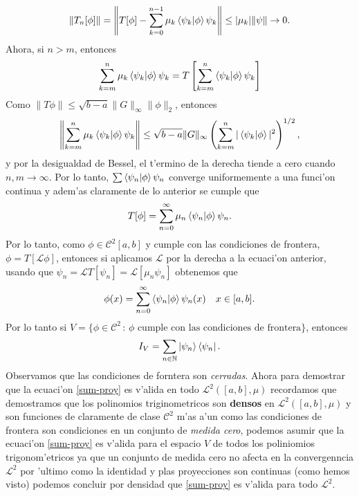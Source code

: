\documentclass[main.tex]{subfiles}
\begin{document}
\[
  \|T_{n}[\phi]\|=\left\|T[\phi]-\sum_{k=0}^{n-1}\mu_{k}\braket{\psi_{k}|\phi}\psi_{k}\right\|\leq|\mu_{k}|\|\psi\|\to0.
\]
Ahora, si $n>m$, entonces
\[
  \sum_{k=m}^{n}\mu_{k}\braket{\psi_{k}|\phi}\psi_{k}=T\left[\sum_{k=m}^{n}\braket{\psi_{k}|\phi}\psi_{k}\right]
\]
Como $\|T\phi\|\leq\sqrt{b-a}\|G\|_{\infty}\|\phi\|_{2}$, entonces
\[
  \left\|\sum_{k=m}^{n}\mu_{k}\braket{\psi_{k}|\phi}\psi_{k}\right\|\leq
  \sqrt{b-a}\|G\|_{\infty}\left(\sum_{k=m}^{n}|\braket{\psi_{k}|\phi}|^{2}\right)^{1/2},
\]
y por la desigualdad de Bessel, el t'ermino de la derecha tiende a cero cuando $n,m\to\infty$. Por lo tanto, $\sum\braket{\psi_{n}|\phi}\psi_{n}$ converge uniformemente a una funci'on continua y adem'as claramente de lo anterior se cumple que
\[
  T[\phi]=\sum_{n=0}^{\infty}\mu_{n}\braket{\psi_{n}|\phi}\psi_{n}.
\]
Por lo tanto, como $\phi\in\mathcal{C}^{2}[a,b]$ y cumple con las condiciones de frontera, $\phi=T[\mathcal{L}\phi]$, entonces si aplicamos $\mathcal{L}$ por la derecha a la ecuaci'on anterior, usando que $\psi_{n}=\mathcal{L}T[\psi_{n}]=\mathcal{L}[\mu_{n}\psi_{n}]$ obtenemos que
\[
  \phi(x)=\sum_{n=0}^{\infty}\braket{\psi_{n}|\phi}\psi_{n}(x)\quad x\in[a,b].
\]
Por lo tanto si $V=\{\phi\in\mathcal{C}^{2}\,:\,\phi\text{ cumple con las condiciones de frontera}\}$, entonces
  \begin{equation}\label{sum-proy}
    I_{V}=\sum_{n\in \mathbb N }\ket{\psi_{n}}\bra{\psi_{n}}.
  \end{equation}
  Observamos que las condiciones de forntera son \emph{cerradas}. Ahora para demostrar que la ecuaci'on \ref{sum-proy} es v'alida en todo $\mathcal{L}^{2}([a,b],\mu)$ recordamos que demostramos que los polinomios triginometricos son \textbf{densos} en $\mathcal{L}^{2}([a,b],\mu)$ y son funciones de claramente de clase $\mathcal{C}^{2}$ m'as a'un como las condiciones de frontera son condiciones en un conjunto de \emph{medida cero}, podemos asumir que la ecuaci'on \ref{sum-proy} es v'alida para el espacio $V$ de todos los poliniomios trigonom'etricos ya que un conjunto de medida cero no afecta  en la convergenncia $\mathcal{L}^{2}$ por 'ultimo como la identidad y plas proyecciones son continuas (como hemos visto) podemos concluir por densidad que \ref{sum-proy} es v'alida para todo $\mathcal{L}^{2}$. \QED
\end{document}
